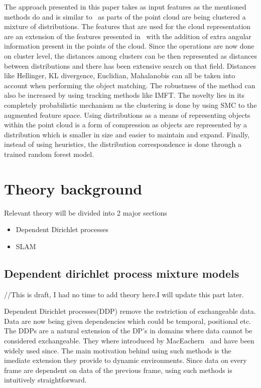 \documentclass[twoside,hidelinks]{article}
\begin{document}
The approach presented in this paper takes as input features as the mentioned methods do and is similar to~\cite{objectDisc} as parts of the point cloud are being clustered a mixture of distributions. The features that are used for the cloud representation are an extension of the features presented in~\cite{smcddp} with the addition of extra angular information present in the points of the cloud. Since the operations are now done on cluster level, the distances among clusters can be then represented as distances between distributions and there has been extensive search on that field. Distances like Hellinger, KL divergence, Euclidian, Mahalanobis can all be taken into account when performing the object matching. The robustness of the method can also be increased by using tracking methods like IMFT. The novelty lies in its completely probabilistic mechanism as the clustering is done by using SMC to the augmented feature space. Using distributions as a means of representing objects within the point cloud is a form of compression as objects are represented by a distribution which is smaller in size and easier to maintain and expand. Finally, instead of using heuristics, the distribution correspondence is done through a trained random forest model.




\section{Theory background}
\label{sec:theory}

Relevant theory will be divided into 2 major sections
\begin{itemize}
	\item Dependent Dirichlet processes
	\item SLAM
\end{itemize}



\subsection{Dependent dirichlet process mixture models}
//This is draft, I had no time to add theory here.I will update this part later.

Dependent Dirichlet processes(DDP) remove the restriction of exchangeable data. Data are now being given dependencies which could be temporal, positional etc. The DDPs are a natural extension of the DP's in domains where data cannot be considered exchangeable. They where introduced by MacEachern~\cite{theory:ddp} and have been widely used since. The main motivation behind using such methods is the imediate extension they provide to dynamic environments. Since data on every frame are dependent on data of the previous frame, using such methods is intuitively straightforward.
\end{document}
